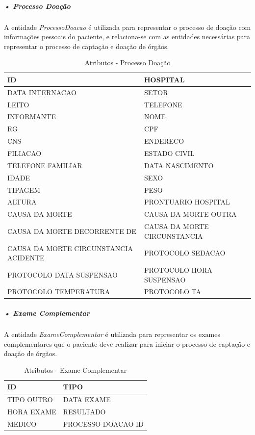 \documentclass[portuguese,oneside]{tcc}
\begin{document}
\subparagraph{• Processo Doação}
A entidade \textit{ProcessoDoacao} é utilizada para representar o processo de doação com informações pessoais do paciente, e relaciona-se com as entidades necessárias para representar o processo de captação e doação de órgãos.

\begin{table}
\centering
\caption{Atributos - Processo Doação} \label{table:atr-processo}
\begin{tabular}{ |p{6cm}|p{6cm}| }

\hline
ID & HOSPITAL\\
\hline
DATA INTERNACAO & SETOR\\
\hline
LEITO & TELEFONE\\
\hline
INFORMANTE & NOME \\
\hline
RG & CPF\\
\hline
CNS & ENDERECO\\
\hline
FILIACAO & ESTADO CIVIL\\
\hline
TELEFONE FAMILIAR & DATA NASCIMENTO\\
\hline
IDADE & SEXO\\
\hline
TIPAGEM & PESO\\
\hline
ALTURA & PRONTUARIO HOSPITAL\\
\hline
CAUSA DA MORTE & CAUSA DA MORTE OUTRA\\
\hline
CAUSA DA MORTE DECORRENTE DE & CAUSA DA MORTE CIRCUNSTANCIA\\
\hline
CAUSA DA MORTE CIRCUNSTANCIA ACIDENTE & PROTOCOLO SEDACAO\\
\hline
PROTOCOLO DATA SUSPENSAO & PROTOCOLO HORA SUSPENSAO\\
\hline
PROTOCOLO TEMPERATURA & PROTOCOLO TA\\
\hline

\end{tabular}
\end{table}

\newpage

\subparagraph{• Exame Complementar}
A entidade \textit{ExameComplementar} é utilizada para representar os exames complementares que o paciente deve realizar para iniciar o processo de captação e doação de órgãos.

\begin{table}
\centering
\caption{Atributos - Exame Complementar} \label{table:atr-exame-complementar}
\begin{tabular}{ |p{6cm}|p{6cm}| }

\hline
ID & TIPO\\
\hline
TIPO OUTRO & DATA EXAME\\
\hline
HORA EXAME & RESULTADO\\
\hline
MEDICO & PROCESSO DOACAO ID \\
\hline

\end{tabular}
\end{table}
\end{document}
